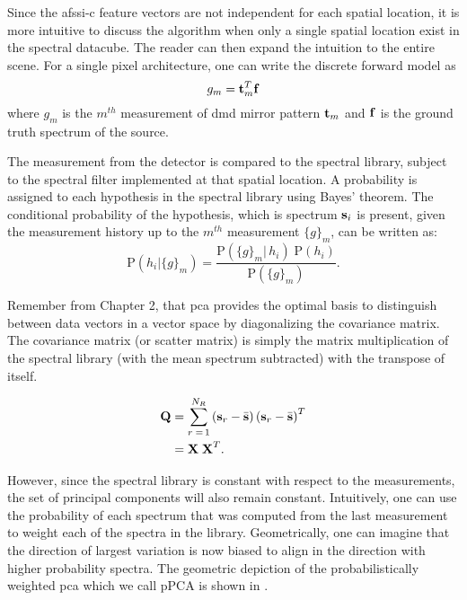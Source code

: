 Since the \gls{afssi-c} feature vectors are not independent for each spatial location, it is more intuitive to discuss the algorithm when only a single spatial location exist in the spectral datacube. The reader can then expand the intuition to the entire scene. For a single pixel architecture, one can write the discrete forward model as
%
\begin{equation}
g_m = \displaystyle \mathbf{t}_{m}^{T} \displaystyle \mathbf{f}
\end{equation}
%
where $g_m$ is the $m^{th}$ measurement of \gls{dmd} mirror pattern $\displaystyle \mathbf{t}_m$ and $\displaystyle \mathbf{f}$ is the ground truth spectrum of the source. 

The measurement from the detector is compared to the spectral library, subject to the spectral filter implemented at that spatial location. A probability is assigned to each hypothesis in the spectral library using Bayes' theorem. The conditional probability of the hypothesis, which is spectrum $\displaystyle \mathbf{s}_i$ is present, given the measurement history up to the $m^{th}$ measurement $\{g\}_m$, can be written as:
%
\begin{equation}\label{eq:BayesThm2}
\mbox{P} \left( h_i | \{ g \}_m \right) = \frac{\mbox{P} \left( \{g\}_m |\, h_i \right) \; \mbox{P} \left(h_i\right)}{\mbox{P} \left( \{g\}_m \right)}.
\end{equation}



Remember from Chapter 2, that \gls{pca} provides the optimal basis to distinguish between data vectors in a vector space by diagonalizing the covariance matrix. The covariance matrix (or scatter matrix) is simply the matrix multiplication of the spectral library (with the mean spectrum subtracted) with the transpose of itself. 

\begin{align}
\textbf{Q} &= \sum^{N_{R}}_{r \;= \,1} \left(\textbf{s}_r - \bar{\textbf{s}} \right) \left(\textbf{s}_r - \bar{\textbf{s}} \right)^T \notag \\
&=\textbf{X}\;\textbf{X}^T. \label{eq:nonweightedScatter}
\end{align}

However, since the spectral library is constant with respect to the measurements, the set of principal components will also remain constant. Intuitively, one can use the probability of each spectrum that was computed from the last measurement to weight each of the spectra in the library. Geometrically, one can imagine that the direction of largest variation is now biased to align in the direction with higher probability spectra. The geometric depiction of the probabilistically weighted \acrfull{pca} which we call pPCA is shown in .

